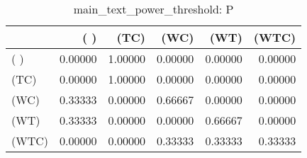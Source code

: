 \begin{table}
\centering
\caption{main_text_power_threshold: P}
\begin{tabular}{lrrrrr}
\toprule
{} &     ( ) &    (TC) &    (WC) &    (WT) &   (WTC) \\
\midrule
( )   & 0.00000 & 1.00000 & 0.00000 & 0.00000 & 0.00000 \\
(TC)  & 0.00000 & 1.00000 & 0.00000 & 0.00000 & 0.00000 \\
(WC)  & 0.33333 & 0.00000 & 0.66667 & 0.00000 & 0.00000 \\
(WT)  & 0.33333 & 0.00000 & 0.00000 & 0.66667 & 0.00000 \\
(WTC) & 0.00000 & 0.00000 & 0.33333 & 0.33333 & 0.33333 \\
\bottomrule
\end{tabular}
\end{table}
